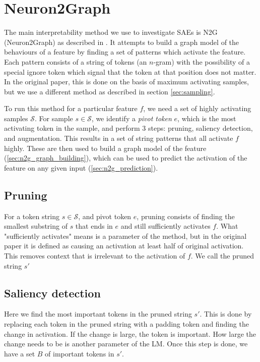 \section{Neuron2Graph}
\label{sec:n2g}
The main interpretability method we use to investigate \acp{SAE} is \ac{N2G} (Neuron2Graph)
as described in \cite{foote_neuron_2023}.
It attempts to build a graph model of the behaviours of a feature 
by finding a set of patterns which activate the feature.
Each pattern consists of a string of tokens (an $n$-gram) 
with the possibility of a special ignore token 
which signal that the token at that position does not matter.
In the original paper, this is done on the basis of maximum activating samples, but we use a different method as described in section \ref{sec:sampling}.

To run this method for a particular feature $f$, 
we need a set of highly activating samples $\mathcal S$.
For sample $s\in\mathcal S$, we identify a \emph{pivot token} $e$, 
which is the most activating token in the sample, 
and perform 3 steps: pruning, saliency detection, and augmentation.
This results in a set of string patterns that all activate $f$ highly.
These are then used to build a graph model of the feature (\autoref{sec:n2g_graph_building}), which can be used to predict the activation of the feature on any given input (\autoref{sec:n2g_prediction}).

\subsection{Pruning}
\label{sec:n2g_pruning}
For a token string $s\in\mathcal S$, and pivot token $e$, 
pruning consists of finding the smallest substring of $s$ that ends in $e$ 
and still sufficiently activates $f$.
What "sufficiently activates" means is a parameter of the method, 
but in the original paper it is defined as causing an activation at least
half of original activation.
This removes context that is irrelevant to the activation of $f$.
We call the pruned string $s'$

\subsection{Saliency detection}
\label{sec:n2g_saliency}
Here we find the most important tokens in the pruned string $s'$.
This is done by replacing each token in the pruned string 
with a padding token and finding the change in activation.
If the change is large, the token is important.
How large the change needs to be is another parameter of the \ac{LM}.
Once this step is done, we have a set $B$ of important tokens in $s'$.

